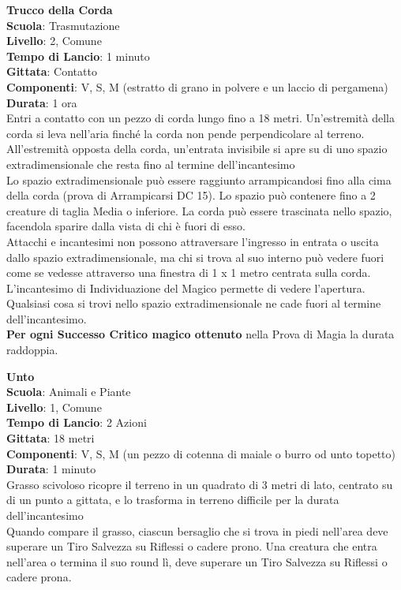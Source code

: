 \begin{multicols}{2}
\medskip\textbf{Trucco della Corda}\\
\textbf{Scuola}: Trasmutazione\\
\textbf{Livello}: 2, Comune\\
\textbf{Tempo di Lancio}: 1 minuto\\
\textbf{Gittata}: Contatto\\
\textbf{Componenti}: V, S, M (estratto di grano in polvere e un laccio di pergamena)\\
\textbf{Durata}: 1 ora\\
Entri a contatto con un pezzo di corda lungo fino a 18 metri. Un'estremità della corda si leva nell'aria finché la corda non pende perpendicolare al terreno. All'estremità opposta della corda, un'entrata invisibile si apre su di uno spazio extradimensionale che resta fino al termine dell'incantesimo \\
Lo spazio extradimensionale può essere raggiunto arrampicandosi fino alla cima della corda (prova di Arrampicarsi DC 15). Lo spazio può contenere fino a 2 creature di taglia Media o inferiore. La corda può essere trascinata nello spazio, facendola sparire dalla vista di chi è fuori di esso.\\
Attacchi e incantesimi non possono attraversare l'ingresso in entrata o uscita dallo spazio extradimensionale, ma chi si trova al suo interno può vedere fuori come se vedesse attraverso una finestra di 1 x 1 metro centrata sulla corda. L'incantesimo di Individuazione del Magico permette di vedere l'apertura. Qualsiasi cosa si trovi nello spazio extradimensionale ne cade fuori al termine dell'incantesimo.\\
\textbf{Per ogni Successo Critico magico ottenuto} nella Prova di Magia la durata raddoppia.

\medskip\textbf{Unto}\\
\textbf{Scuola}: Animali e Piante\\
\textbf{Livello}: 1, Comune\\
\textbf{Tempo di Lancio}: 2 Azioni\\
\textbf{Gittata}: 18 metri\\
\textbf{Componenti}: V, S, M (un pezzo di cotenna di maiale o burro od unto topetto)\\
\textbf{Durata}: 1 minuto\\
Grasso scivoloso ricopre il terreno in un quadrato di 3 metri di lato, centrato su di un punto a gittata, e lo trasforma in terreno difficile per la durata dell'incantesimo\\
Quando compare il grasso, ciascun bersaglio che si trova in piedi nell'area deve superare un Tiro Salvezza su Riflessi o cadere prono. Una creatura che entra nell'area o termina il suo round lì, deve superare un Tiro Salvezza su Riflessi o cadere prona.


\end{multicols}
